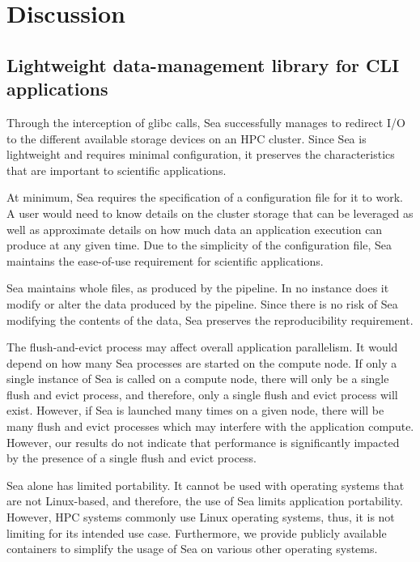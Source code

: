 \section{Discussion}

    \subsection{Lightweight data-management library for CLI applications}

    Through the interception of glibc calls, Sea successfully manages to
    redirect I/O to the different available storage devices on an HPC cluster.
    Since Sea is lightweight and requires minimal configuration, it preserves
    the characteristics that are important to scientific applications.

    At minimum, Sea requires the specification of a configuration file for it to
    work. A user would need to know details on the cluster storage that can be
    leveraged as well as approximate details on how much data an application
    execution can produce at any given time. Due to the simplicity of the
    configuration file, Sea maintains the ease-of-use requirement for scientific
    applications.

    Sea maintains whole files, as produced by the pipeline. In no instance does
    it modify or alter the data produced by the pipeline. Since there is no risk
    of Sea modifying the contents of the data, Sea preserves the reproducibility
    requirement.

    The flush-and-evict process may affect overall application parallelism. It
    would depend on how many Sea processes are started on the compute node. If
    only a single instance of Sea is called on a compute node, there will only
    be a single flush and evict process, and therefore, only a single flush and
    evict process will exist. However, if Sea is launched many times on a given
    node, there will be many flush and evict processes which may interfere with
    the application compute. However, our results do not indicate that
    performance is significantly impacted by the presence of a single flush and
    evict process.  

    Sea alone has limited portability. It cannot be used with operating systems
    that are not Linux-based, and therefore, the use of Sea limits application
    portability. However, HPC systems commonly use Linux operating systems,
    thus, it is not limiting for its intended use case. Furthermore, we provide
    publicly available containers to simplify the usage of Sea on various other
    operating systems.

